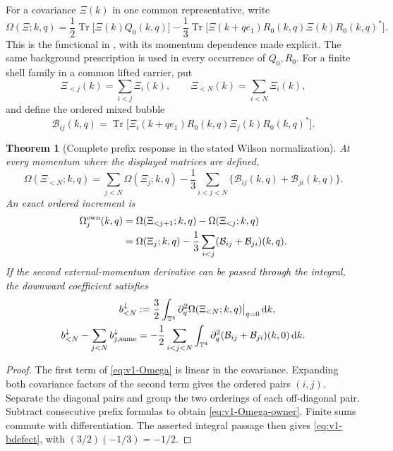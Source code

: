 \documentclass[11pt,a4paper]{article}
\newtheorem{theorem}{Theorem}[section]
\theoremstyle{definition}
\theoremstyle{remark}
\DeclareMathOperator{\Tr}{Tr}
\newcommand{\T}{\mathbb T}
\newcommand{\dd}{\mathrm d}
\newcommand{\src}[2]{\cite[#2]{#1}}
\begin{document}
For a covariance $\Xi(k)$ in one common representative, write
\begin{equation}\label{eq:v1-Omega}
 \Omega(\Xi;k,q)=\frac12\Tr\bigl[\Xi(k)Q_0(k,q)\bigr]
 -\frac13\Tr\bigl[\Xi(k+qe_1)R_0(k,q)\Xi(k)R_0(k,q)^*\bigr].
\end{equation}
This is the functional in
\src{YM3}{\texttt{eq:shell-functional}}, with its momentum dependence
made explicit. The same background prescription is used in every
occurrence of $Q_0,R_0$. For a finite shell family in a common lifted
carrier, put
\[
 \Xi_{<j}(k)=\sum_{i<j}\Xi_i(k),\qquad
 \Xi_{<N}(k)=\sum_{i<N}\Xi_i(k),
\]
and define the ordered mixed bubble
\begin{equation}\label{eq:v1-Bij}
 \mathcal B_{ij}(k,q)=\Tr\bigl[
 \Xi_i(k+qe_1)R_0(k,q)\Xi_j(k)R_0(k,q)^*\bigr].
\end{equation}

\begin{theorem}[Complete prefix response in the stated Wilson normalization]
\label{thm:v1-Wilson}
At every momentum where the displayed matrices are defined,
\begin{equation}\label{eq:v1-Omega-total}
 \boxed{\displaystyle
 \Omega(\Xi_{<N};k,q)
 =\sum_{j<N}\Omega(\Xi_j;k,q)
     -\frac13\sum_{i<j<N}\{\mathcal B_{ij}(k,q)+\mathcal B_{ji}(k,q)\}.}
\end{equation}
An exact ordered increment is
\begin{align}
 \Omega_j^{\rm own}(k,q)
 &=\Omega(\Xi_{<j+1};k,q)-\Omega(\Xi_{<j};k,q)\notag\\
 &=\Omega(\Xi_j;k,q)
       -\frac13\sum_{i<j}(\mathcal B_{ij}+\mathcal B_{ji})(k,q).
                                  \label{eq:v1-Omega-owner}
\end{align}
If the second external-momentum derivative can be passed through the
integral, the downward coefficient satisfies
\begin{align}
 b_{<N}^{\downarrow}
 &:=\frac32\int_{\T^4}
        \partial_q^2\Omega(\Xi_{<N};k,q)\big|_{q=0}\,\dd k,
                                         \label{eq:v1-bcomplete}\\
 b_{<N}^{\downarrow}-\sum_{j<N}b_{j,\rm same}^{\downarrow}
 &=-\frac12\sum_{i<j<N}\int_{\T^4}
       \partial_q^2(\mathcal B_{ij}+\mathcal B_{ji})(k,0)\,\dd k.
                                         \label{eq:v1-bdefect}
\end{align}
\end{theorem}
\begin{proof}
The first term of \cref{eq:v1-Omega} is linear in the covariance. Expanding
both covariance factors of the second term gives the ordered pairs
$(i,j)$. Separate the diagonal pairs and group the two orderings of
each off-diagonal pair. Subtract consecutive prefix formulas to obtain
\cref{eq:v1-Omega-owner}. Finite sums commute with differentiation.
The asserted integral passage then gives \cref{eq:v1-bdefect}, with
$(3/2)(-1/3)=-1/2$.
\end{proof}
\end{document}
